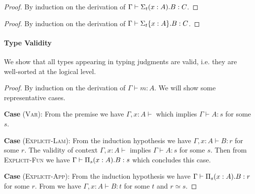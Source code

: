 \begin{proof}
  By induction on the derivation of $\Gamma \vdash \Sigma_{t}({x : A}).{B} : C$.
\end{proof}

\begin{proof}
  By induction on the derivation of $\Gamma \vdash \Sigma_{t}\{{x : A}\}.{B} : C$.
\end{proof}

\paragraph{\textbf{Type Validity}}
We show that all types appearing in typing judgments are valid, i.e. they are well-sorted
at the logical level.

\begin{proof}
  By induction on the derivation of $\Gamma \vdash m : A$. We will show some representative cases.

\textbf{Case} (\textsc{Var}): 
  From the premise we have $\Gamma, x : A \vdash$ which implies $\Gamma \vdash A : s$ for some $s$.

\textbf{Case} (\textsc{Explicit-Lam}):
  From the induction hypothesis we have $\Gamma, x : A \vdash B : r$ for some $r$.
  The validity of context $\Gamma, x : A \vdash$ implies $\Gamma \vdash A : s$ for some $s$.
  Then from \textsc{Explicit-Fun} we have $\Gamma \vdash \Pi_{s}({x : A}).{B} : s$ which concludes this case.

\textbf{Case} (\textsc{Explicit-App}):
  From the induction hypothesis we have $\Gamma \vdash \Pi_{s}({x : A}).{B} : r$ for some $r$.
  From  we have $\Gamma, x : A \vdash B : t$ for some $t$ and $r \simeq s$.
\end{proof}